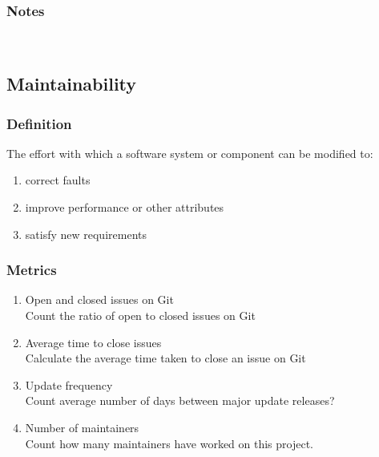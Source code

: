 \documentclass{article}
\begin{document}
\subsubsection{Notes}

~\newpage

\subsection{Maintainability}
\subsubsection{Definition}
The effort with which a software system or component can be modified to:

\begin{enumerate}
	\item correct faults
	\item improve performance or other
	attributes
	\item satisfy new requirements
\end{enumerate}

\subsubsection{Metrics}
\begin{enumerate}
	\item Open and closed issues on Git\\
	
	Count the ratio of open to closed issues on Git
	\item Average time to close issues\\
	
	Calculate the average time taken to close an issue on Git
	\item Update frequency\\
	
	Count average number of days between major update releases?
	\item Number of maintainers
\\
	
	Count how many maintainers have worked on this project.\\
\end{enumerate}
\end{document}

